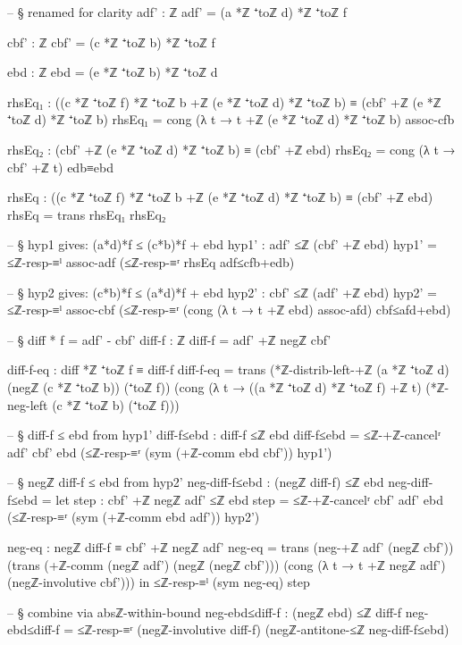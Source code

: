 \documentclass[11pt,a4paper]{book}
\begin{document}
\begin{code}
    -- § renamed for clarity
    adf' : ℤ
    adf' = (a *ℤ ⁺toℤ d) *ℤ ⁺toℤ f

    cbf' : ℤ
    cbf' = (c *ℤ ⁺toℤ b) *ℤ ⁺toℤ f

    ebd : ℤ
    ebd = (e *ℤ ⁺toℤ b) *ℤ ⁺toℤ d

    rhsEq₁ : ((c *ℤ ⁺toℤ f) *ℤ ⁺toℤ b +ℤ (e *ℤ ⁺toℤ d) *ℤ ⁺toℤ b) ≡ (cbf' +ℤ (e *ℤ ⁺toℤ d) *ℤ ⁺toℤ b)
    rhsEq₁ = cong (λ t → t +ℤ (e *ℤ ⁺toℤ d) *ℤ ⁺toℤ b) assoc-cfb

    rhsEq₂ : (cbf' +ℤ (e *ℤ ⁺toℤ d) *ℤ ⁺toℤ b) ≡ (cbf' +ℤ ebd)
    rhsEq₂ = cong (λ t → cbf' +ℤ t) edb≡ebd

    rhsEq : ((c *ℤ ⁺toℤ f) *ℤ ⁺toℤ b +ℤ (e *ℤ ⁺toℤ d) *ℤ ⁺toℤ b) ≡ (cbf' +ℤ ebd)
    rhsEq = trans rhsEq₁ rhsEq₂

    -- § hyp1 gives: (a*d)*f ≤ (c*b)*f + ebd
    hyp1' : adf' ≤ℤ (cbf' +ℤ ebd)
    hyp1' = ≤ℤ-resp-≡ˡ assoc-adf (≤ℤ-resp-≡ʳ rhsEq adf≤cfb+edb)

    -- § hyp2 gives: (c*b)*f ≤ (a*d)*f + ebd
    hyp2' : cbf' ≤ℤ (adf' +ℤ ebd)
    hyp2' = ≤ℤ-resp-≡ˡ assoc-cbf (≤ℤ-resp-≡ʳ (cong (λ t → t +ℤ ebd) assoc-afd) cbf≤afd+ebd)

    -- § diff * f = adf' - cbf'
    diff-f : ℤ
    diff-f = adf' +ℤ negℤ cbf'

    diff-f-eq : diff *ℤ ⁺toℤ f ≡ diff-f
    diff-f-eq =
      trans
        (*ℤ-distrib-left-+ℤ (a *ℤ ⁺toℤ d) (negℤ (c *ℤ ⁺toℤ b)) (⁺toℤ f))
        (cong (λ t → ((a *ℤ ⁺toℤ d) *ℤ ⁺toℤ f) +ℤ t) (*ℤ-neg-left (c *ℤ ⁺toℤ b) (⁺toℤ f)))

    -- § diff-f ≤ ebd from hyp1'
    diff-f≤ebd : diff-f ≤ℤ ebd
    diff-f≤ebd = ≤ℤ-+ℤ-cancelʳ adf' cbf' ebd (≤ℤ-resp-≡ʳ (sym (+ℤ-comm ebd cbf')) hyp1')

    -- § negℤ diff-f ≤ ebd from hyp2'
    neg-diff-f≤ebd : (negℤ diff-f) ≤ℤ ebd
    neg-diff-f≤ebd =
      let
        step : cbf' +ℤ negℤ adf' ≤ℤ ebd
        step = ≤ℤ-+ℤ-cancelʳ cbf' adf' ebd (≤ℤ-resp-≡ʳ (sym (+ℤ-comm ebd adf')) hyp2')

        neg-eq : negℤ diff-f ≡ cbf' +ℤ negℤ adf'
        neg-eq =
          trans
            (neg-+ℤ adf' (negℤ cbf'))
            (trans
              (+ℤ-comm (negℤ adf') (negℤ (negℤ cbf')))
              (cong (λ t → t +ℤ negℤ adf') (negℤ-involutive cbf')))
      in
      ≤ℤ-resp-≡ˡ (sym neg-eq) step

    -- § combine via absℤ-within-bound
    neg-ebd≤diff-f : (negℤ ebd) ≤ℤ diff-f
    neg-ebd≤diff-f = ≤ℤ-resp-≡ʳ (negℤ-involutive diff-f) (negℤ-antitone-≤ℤ neg-diff-f≤ebd)


\end{code}
\end{document}
